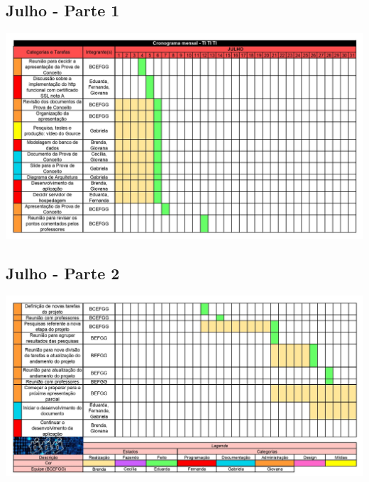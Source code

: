 \begin{apendicesenv}
\begin{flushleft}
    \section{Julho - Parte 1}
\end{flushleft}
\centering
\includegraphics[scale=0.75,angle=90,pagecommand=\chapter{Cronograma Mensal - Junho - Parte 2}\label{cronograma-junho2}]{imagens/CronogramaJULHO_01.jpg}

\begin{flushleft}
    \section{Julho - Parte 2}
\end{flushleft}
\centering
\includegraphics[scale=0.75,angle=90,pagecommand=\chapter{Cronograma Mensal - Junho - Parte 2}\label{cronograma-junho2}]{imagens/CronogramaJULHO_02.jpg}

\end{apendicesenv}
